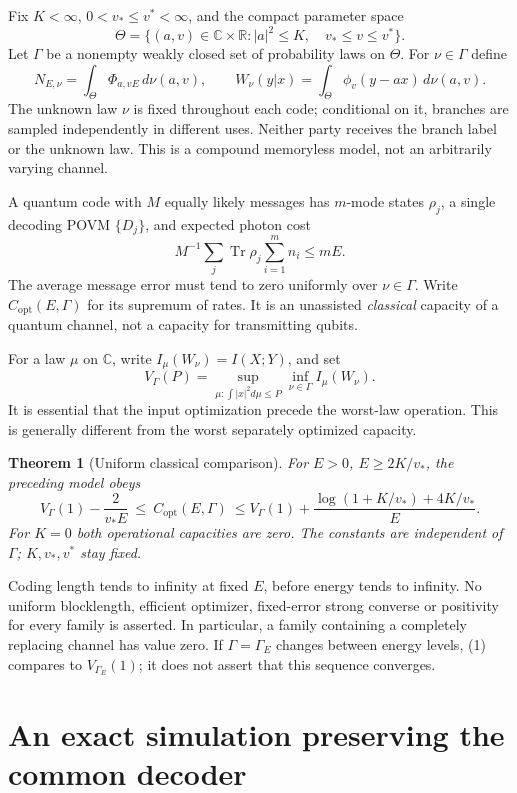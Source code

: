 \documentclass[11pt]{article}
\newtheorem{theorem}{Theorem}
\newcommand{\C}{\mathbb C}
\newcommand{\Tr}{\operatorname{Tr}}
\newcommand{\capq}{C_{\mathrm{opt}}}
\begin{document}
Fix \(K<\infty\), \(0<v_*\leq v^*<\infty\), and the compact parameter
space
\[
 \Theta=\{(a,v)\in\C\times\mathbb R: |a|^2\leq K,\quad
                                    v_*\leq v\leq v^*\}.
\]
Let \(\Gamma\) be a nonempty weakly closed set of probability laws on
\(\Theta\). For \(\nu\in\Gamma\) define
\[
 N_{E,\nu}=\int_\Theta\Phi_{a,vE}\,d\nu(a,v),\qquad
 W_\nu(y|x)=\int_\Theta\phi_v(y-ax)\,d\nu(a,v).
\]
The unknown law \(\nu\) is fixed throughout each code; conditional on it,
branches are sampled independently in different uses. Neither party
receives the branch label or the unknown law. This is a compound
memoryless model, not an arbitrarily varying channel.

A quantum code with \(M\) equally likely messages has \(m\)-mode states
\(\rho_j\), a single decoding POVM \(\{D_j\}\), and expected photon cost
\[
 M^{-1}\sum_j\Tr\rho_j\sum_{i=1}^m n_i\leq mE .
\]
The average message error must tend to zero uniformly over \(\nu\in\Gamma\).
Write \(\capq(E,\Gamma)\) for its supremum of rates. It is an
unassisted \emph{classical} capacity of a quantum channel, not a
capacity for transmitting qubits.

For a law \(\mu\) on \(\C\), write \(I_\mu(W_\nu)=I(X;Y)\), and set
\[
 V_\Gamma(P)=
 \sup_{\mu:\int|x|^2d\mu\leq P}\inf_{\nu\in\Gamma} I_\mu(W_\nu).
\]
It is essential that the input optimization precede the worst-law
operation. This is generally different from the worst separately
optimized capacity.

\begin{theorem}[Uniform classical comparison]\label{thm:main}
For \(E>0\), \(E\geq 2K/v_*\), the preceding model obeys
\[
 V_\Gamma(1)-\frac{2}{v_*E}
 \ \leq\ \capq(E,\Gamma)\
 \leq V_\Gamma(1)+
 \frac{\log(1+K/v_*)+4K/v_*}{E}.                 \tag{1}
\]
For \(K=0\) both operational capacities are zero.
The constants are independent of \(\Gamma\); \(K,v_*,v^*\) stay fixed.
\end{theorem}

Coding length tends to infinity at fixed \(E\), before energy tends to
infinity. No uniform blocklength, efficient optimizer, fixed-error strong
converse or positivity for every family is asserted. In particular,
a family containing a completely replacing channel has value zero.
If \(\Gamma=\Gamma_E\) changes between energy levels, (1) compares to
\(V_{\Gamma_E}(1)\); it does not assert that this sequence converges.

\section{An exact simulation preserving the common decoder}
\end{document}
